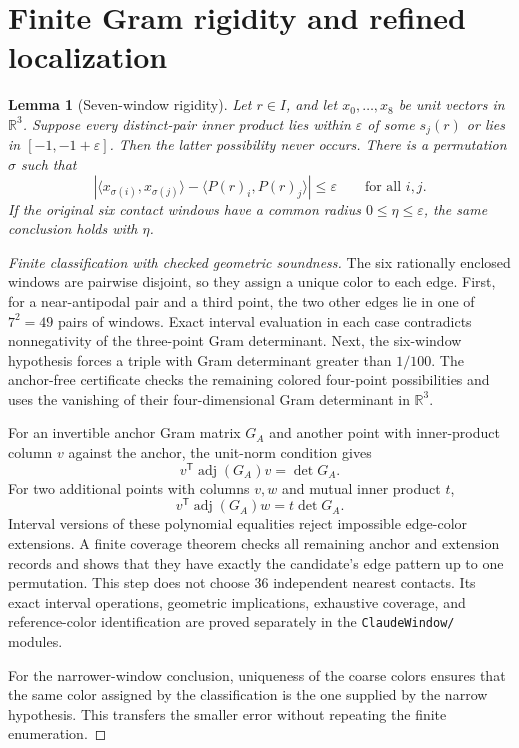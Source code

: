\documentclass[11pt]{article}
\newtheorem{lemma}[theorem]{Lemma}
\theoremstyle{remark}
\newcommand{\R}{\mathbb R}
\newcommand{\ip}[2]{\langle #1,#2\rangle}
\newcommand{\pathcode}[1]{\nolinkurl{#1}}
\begin{document}
\section{Finite Gram rigidity and refined localization}\label{sec:gram}
\begin{lemma}[Seven-window rigidity]\label{lem:rigidity}
Let $r\in I$, and let $x_0,\ldots,x_8$ be unit vectors in $\R^3$. Suppose
every distinct-pair inner product lies within $\varepsilon$ of some $s_j(r)$
or lies in $[-1,-1+\varepsilon]$. Then the latter possibility never occurs.
There is a permutation $\sigma$ such that
\[
 |\ip{x_{\sigma(i)}}{x_{\sigma(j)}}-
             \ip{P(r)_i}{P(r)_j}|\le\varepsilon\qquad\text{for all }i,j.
\]
If the original six contact windows have a common radius
$0\le\eta\le\varepsilon$, the same conclusion holds with $\eta$.
\end{lemma}
\begin{proof}[Finite classification with checked geometric soundness]
The six rationally enclosed windows are pairwise disjoint, so they assign a
unique color to each edge. First, for a near-antipodal pair and a third point,
the two other edges lie in one of $7^2=49$ pairs of windows. Exact interval
evaluation in each case contradicts nonnegativity of the three-point Gram
determinant. Next, the six-window hypothesis forces a triple with Gram
determinant greater than $1/100$. The anchor-free certificate checks the
remaining colored four-point possibilities and uses the vanishing of their
four-dimensional Gram determinant in $\R^3$.

For an invertible anchor Gram matrix $G_A$ and another point with inner-product
column $v$ against the anchor, the unit-norm condition gives
\[
 v^{\mathsf T}\operatorname{adj}(G_A)v=\det G_A.
\]
For two additional points with columns $v,w$ and mutual inner product $t$,
\[
 v^{\mathsf T}\operatorname{adj}(G_A)w=t\det G_A.
\]
Interval versions of these polynomial equalities reject impossible edge-color
extensions. A finite coverage theorem checks all remaining anchor and extension
records and shows that they have exactly the candidate's edge pattern up to
one permutation. This step does not choose 36 independent nearest contacts.
Its exact interval operations, geometric implications, exhaustive coverage,
and reference-color identification are proved separately in the
\pathcode{ClaudeWindow/} modules.

For the narrower-window conclusion, uniqueness of the coarse colors ensures
that the same color assigned by the classification is the one supplied by
the narrow hypothesis. This transfers the smaller error without repeating
the finite enumeration.
\end{proof}
\end{document}
